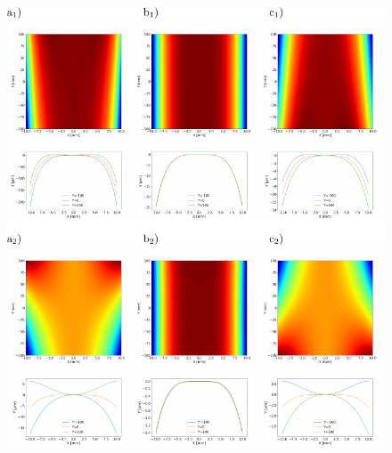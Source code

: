 \documentclass{iucr}              %
\begin{document}
\begin{figure}\label{fig:detrended}
\includegraphics[width=1.0\textwidth]{figures/fig7.pdf}


\end{figure}
\end{document}
